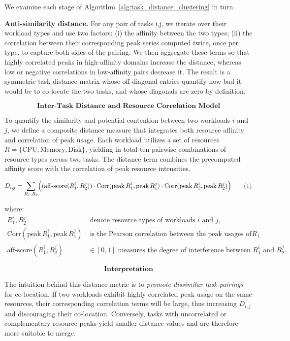 We examine each stage of Algorithm~\ref{alg:task_distance_clustering} in turn.

\textbf{Anti-similarity distance.} For any pair of tasks i,j, we iterate over their workload types and use two factors: (i) the affinity between the two types; (ii) the correlation between their corresponding peak series computed twice, once per type, to capture both sides of the pairing. We then aggregate these terms so that highly correlated peaks in high-affinity domains increase the distance, whereas low or negative correlations in low-affinity pairs decrease it. The result is a symmetric task distance matrix whose off-diagonal entries quantify how bad it would be to co-locate the two tasks, and whose diagonals are zero by definition.

\[
    \textbf{Inter-Task Distance and Resource Correlation Model}
\]

To quantify the similarity and potential contention between two workloads
\( i \) and \( j \), we define a composite distance measure
that integrates both resource affinity and correlation of peak usage.
Each workload utilizes a set of resources
\( R = \{ \text{CPU}, \text{Memory}, \text{Disk}\} \),
yielding in total ten pairwise combinations of resource types across two tasks.
The distance term combines the precomputed affinity score with the
correlation of peak resource intensities.

\[
    D_{i,j}
    = \sum_{R_1, R_2}
    \Bigl(
    (\mathrm{aff\text{-}score}(R_1^i, R_2^j))
    \cdot
    \mathrm{Corr}(\mathrm{peak}\,R_1^i, \mathrm{peak}\,R_1^j)
    \cdot
    \mathrm{Corr}(\mathrm{peak}\,R_2^i, \mathrm{peak}\,R_2^j)
    \Bigr)
    \tag{1}
\]

where:
\begin{align}
    R_1^i, R_2^j & \; \text{denote resource types of workloads } i \text{ and } j,                           \\[4pt]
    \mathrm{Corr}(\mathrm{peak}\,R_1^i, \mathrm{peak}\,R_1^j)
                 & \; \text{is the Pearson correlation between the peak usages of resource } R_1
    \\[4pt]
    \mathrm{aff\text{-}score}(R_1^i, R_2^j)
                 & \in [0, 1] \text{ measures the degree of interference between } R_1^i \text{ and } R_2^j.
\end{align}

\[
    \textbf{Interpretation}
\]

The intuition behind this distance metric is to
\emph{promote dissimilar task pairings} for co-location.
If two workloads exhibit highly correlated peak usage on the same resources,
their corresponding correlation terms will be large,
thus increasing \( D_{i,j} \) and discouraging their co-location.
Conversely, tasks with uncorrelated or complementary resource peaks
yield smaller distance values and are therefore more suitable to merge.

